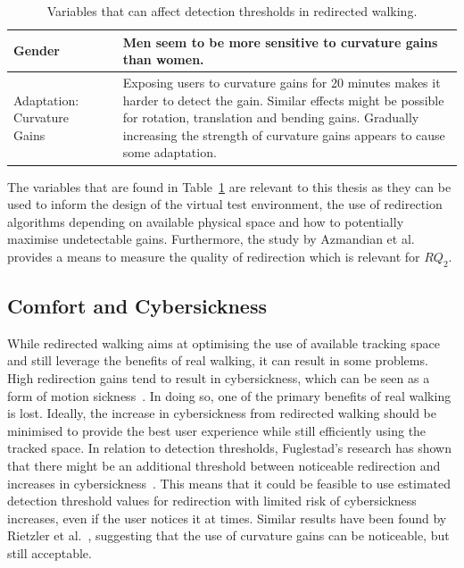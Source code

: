 \begin{table}[!h]
\begin{tabularx}{\textwidth}{|m{2cm}|m{1.7cm}|m{10.1cm}|}
\hline
Gender & \cite{nguyen2018individual} & Men seem to be more sensitive to curvature gains than women.\\
\hline
Adaptation: Curvature Gains & \cite{5072212, bolling2019shrinking, grechkin2016revisiting} & Exposing users to curvature gains for 20 minutes makes it harder to detect the gain. Similar effects might be possible for rotation, translation and bending gains. Gradually increasing the strength of curvature gains appears to cause some adaptation.\\
\hline
\end{tabularx}
\caption[Variables That Can Affect Detection Thresholds in Redirected Walking]{Variables that can affect detection thresholds in redirected walking.}
\label{table:DTVariables}
\end{table}

The variables that are found in Table~\ref{table:DTVariables} are relevant to this thesis as they can be used to inform the design of the virtual test environment, the use of redirection algorithms depending on available physical space and how to potentially maximise undetectable gains. Furthermore, the study by Azmandian et al.~\cite{azmandian2015physical} provides a means to measure the quality of redirection which is relevant for $RQ_2$.

\subsection{Comfort and Cybersickness}
While redirected walking aims at optimising the use of available tracking space and still leverage the benefits of real walking, it can result in some problems. High redirection gains tend to result in cybersickness, which can be seen as a form of motion sickness~\cite{mousavi2013review}. In doing so, one of the primary benefits of real walking is lost. Ideally, the increase in cybersickness from redirected walking should be minimised to provide the best user experience while still efficiently using the tracked space. In relation to detection thresholds, Fuglestad's research has shown that there might be an additional threshold between noticeable redirection and increases in cybersickness~\cite{fuglestad2018redirected}. This means that it could be feasible to use estimated detection threshold values for redirection with limited risk of cybersickness increases, even if the user notices it at times. Similar results have been found by Rietzler et al.~\cite{rietzler2018rethinking}, suggesting that the use of curvature gains can be noticeable, but still acceptable. 


